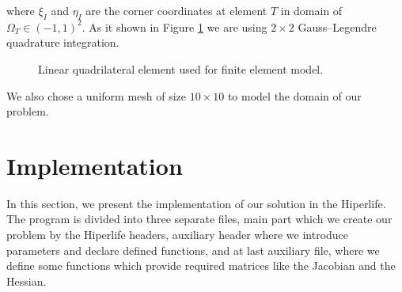 \documentclass[]{article}
\begin{document}
where $\xi_{I}$ and $\eta_{I}$ are the corner coordinates at element $T$ in domain of $\Omega_{T} \in (-1,1)^2$. As it shown in Figure \ref{fig_el} we are using $2 \times 2$ Gauss–Legendre quadrature integration.
\begin{figure}[htbp]
	\centering
	
	\caption{Linear quadrilateral element used for finite element model.}
	\label{fig_el}
\end{figure}
We also chose a uniform mesh of size $10 \times 10$ to model the domain of our problem.
\section{Implementation} \label{sec: imp}
In this section, we present the implementation of our solution in the Hiperlife. The program is divided into three separate files, main part which we create our problem by the Hiperlife headers, auxiliary header where we introduce parameters and declare defined functions, and at last auxiliary file, where we define some functions which provide required matrices like the Jacobian and the Hessian.
\end{document}
